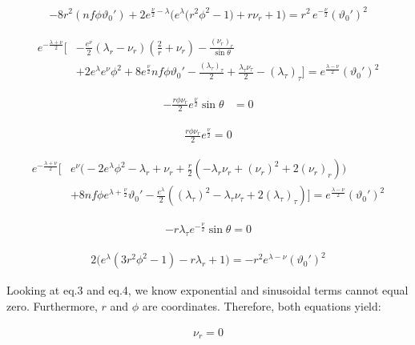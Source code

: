 \documentclass[12pt]{article}
\begin{document}
\begin{align}
-8r^2 \left(nf\phi\vartheta_0' \right)
+2e^{\frac{\nu}{2} - \lambda}
\Big( e^{\lambda} \big(r^2\phi^2 - 1 \big) + r\nu_{r} + 1\Big)
= r^2 \, e^{-\frac{\nu}{2}}(\vartheta_0')^2
\end{align}

\begin{align}
e^{-\frac{\lambda + \nu}{2}} \Big[
 &- \frac{e^{\nu}}{2} \left( \lambda_r - \nu_r \right) \left(\frac{2}{r} + \nu_r\right)
 - \frac{(\nu_r)_r}{\sin\theta} \nonumber \\
 &+ 2 e^{\lambda} e^{\nu} \phi^2
 + 8 e^{\frac{\nu}{2}} nf\phi\vartheta_0'
 - \frac{(\lambda_\tau)_\tau}{2} + \frac{\lambda_\tau \nu_\tau}{2} -(\lambda_\tau)_\tau
\Big] = e^\frac{\lambda - \nu}{2} (\vartheta_0')^2
\label{eq:2}
\end{align}

\begin{align}
- \frac{r \phi \nu_r}{2} e^{\frac{\nu}{2}} \sin\theta &= 0
\label{eq:3}
\end{align}

\begin{align}
\frac{r\phi\nu_r}{2} e^{\frac{\nu}{2}} = 0
\label{eq:4}
\end{align}

\begin{align}
e^{-\frac{\lambda + \nu}{2}} \Big[
 & e^{\nu} \Big(
     - 2e^{\lambda}\phi^2 - \lambda_r + \nu_r 
      + \frac{r}{2} ( - \lambda_r \nu_r + (\nu_r)^2 + 2 (\nu_r)_r )
   \Big) \nonumber \\
 & + 8 nf \phi e^{\lambda + \frac{\nu}{2}} \vartheta_0' - \frac{e^{\lambda}}{2} (\left(\lambda_\tau\right)^2 - \lambda_\tau \nu_\tau + 2 (\lambda_\tau)_\tau)
\Big] = e^\frac{\lambda - \nu}{2}(\vartheta_0')^2
\label{eq:5}
\end{align}

\begin{align}
- r \lambda_\tau e^{-\frac{\nu}{2}}\sin\theta = 0
\end{align}

\begin{align}
2 
\Big(
  e^{\lambda}(3r^2\phi^2 - 1) - r\lambda_r + 1
\Big)
= - r^2 
e^{\lambda-\nu} (\vartheta_0')^2
\end{align}

Looking at eq.3 and eq.4, we know exponential and sinusoidal terms cannot equal zero. Furthermore, $r$ and $\phi$ are coordinates. Therefore, both equations yield:

\begin{align}
  \nu_r = 0
\end{align}
\end{document}
